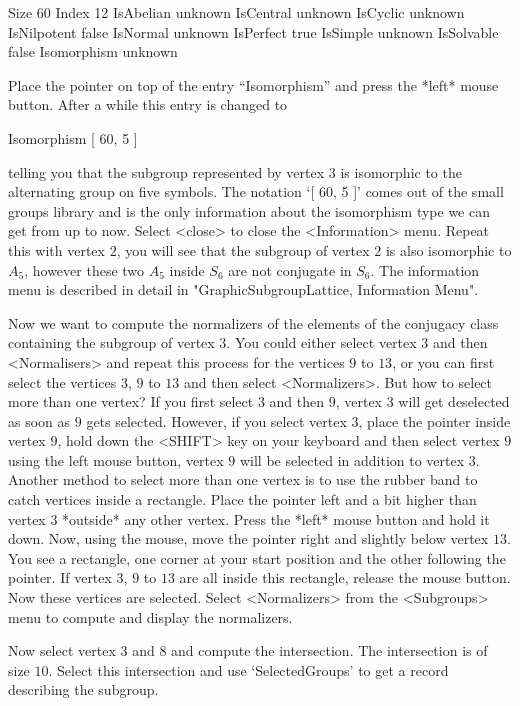 \begintt
Size            60
Index           12
IsAbelian       unknown
IsCentral       unknown
IsCyclic        unknown
IsNilpotent     false
IsNormal        unknown
IsPerfect       true
IsSimple        unknown
IsSolvable      false
Isomorphism     unknown
\endtt

Place the pointer on top of the entry  ``Isomorphism'' and press the *left*
mouse button.  After a while this entry is changed to

\begintt
Isomorphism     [ 60, 5 ]
\endtt

telling you that the subgroup represented by vertex $3$ is isomorphic to
the alternating group on five symbols.  The notation `[ 60, 5 ]' comes out
of the small groups library and is the only information about the
isomorphism type we can get from {} up to now. Select <close> to close
the <Information> menu.  Repeat this with vertex $2$, you will see that the
subgroup of vertex $2$ is also isomorphic to $A_5$, however these two $A_5$
inside $S_6$ are not conjugate in $S_6$.  The information menu is described
in detail in "GraphicSubgroupLattice, Information Menu".

Now we want to compute the  normalizers of the  elements of the conjugacy
class containing the  subgroup of vertex  $3$.   You could either  select
vertex  $3$ and  then  <Normalisers>  and repeat   this process for   the
vertices $9$ to $13$, or you can first select the vertices $3$, $9$ to $13$
and  then select <Normalizers>.  But how  to select more than one vertex?
If you first select $3$ and  then $9$, vertex $3$  will get deselected as
soon as $9$ gets selected.  However, if you  select vertex $3$, place the
pointer inside vertex $9$, hold down the <SHIFT> key on your keyboard and
then select vertex $9$ using  the left mouse button,  vertex $9$ will  be
selected in addition to  vertex $3$.  Another  method to select more than
one  vertex is  to  use  the  rubber   band  to catch vertices  inside  a
rectangle.  Place  the pointer  left and  a  bit  higher than  vertex $3$
*outside*  any other vertex.   Press the *left*  mouse button and hold it
down.  Now, using  the mouse, move the  pointer right and slightly  below
vertex $13$.  You  see a rectangle, one corner  at your start position and
the other   following the pointer.   If  vertex $3$,  $9$ to $13$  are all
inside this rectangle, release the mouse  button.  Now these vertices are
selected.  Select <Normalizers> from the  <Subgroups> menu to compute and
display the normalizers.

Now select vertex $3$ and $8$ and compute the intersection.  The
intersection is of size $10$.  Select this intersection and use
`SelectedGroups' to get a {\GAP} record describing the subgroup.


